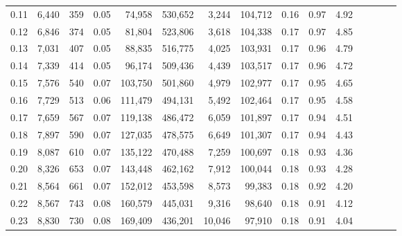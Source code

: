 \begin{tabular}{rrrcrrrrrrrrrrr}
0.11 &   6,440 &    359 &                                       0.05 &   74,958 &  530,652 &    3,244 &  104,712 &  0.16 &  0.97 &                         4.92 \\
0.12 &   6,846 &    374 &                                       0.05 &   81,804 &  523,806 &    3,618 &  104,338 &  0.17 &  0.97 &                         4.85 \\
0.13 &   7,031 &    407 &                                       0.05 &   88,835 &  516,775 &    4,025 &  103,931 &  0.17 &  0.96 &                         4.79 \\
0.14 &   7,339 &    414 &                                       0.05 &   96,174 &  509,436 &    4,439 &  103,517 &  0.17 &  0.96 &                         4.72 \\
0.15 &   7,576 &    540 &                                       0.07 &  103,750 &  501,860 &    4,979 &  102,977 &  0.17 &  0.95 &                         4.65 \\
0.16 &   7,729 &    513 &                                       0.06 &  111,479 &  494,131 &    5,492 &  102,464 &  0.17 &  0.95 &                         4.58 \\
0.17 &   7,659 &    567 &                                       0.07 &  119,138 &  486,472 &    6,059 &  101,897 &  0.17 &  0.94 &                         4.51 \\
0.18 &   7,897 &    590 &                                       0.07 &  127,035 &  478,575 &    6,649 &  101,307 &  0.17 &  0.94 &                         4.43 \\
0.19 &   8,087 &    610 &                                       0.07 &  135,122 &  470,488 &    7,259 &  100,697 &  0.18 &  0.93 &                         4.36 \\
0.20 &   8,326 &    653 &                                       0.07 &  143,448 &  462,162 &    7,912 &  100,044 &  0.18 &  0.93 &                         4.28 \\
0.21 &   8,564 &    661 &                                       0.07 &  152,012 &  453,598 &    8,573 &   99,383 &  0.18 &  0.92 &                         4.20 \\
0.22 &   8,567 &    743 &                                       0.08 &  160,579 &  445,031 &    9,316 &   98,640 &  0.18 &  0.91 &                         4.12 \\
0.23 &   8,830 &    730 &                                       0.08 &  169,409 &  436,201 &   10,046 &   97,910 &  0.18 &  0.91 &                         4.04 \\

\end{tabular}
